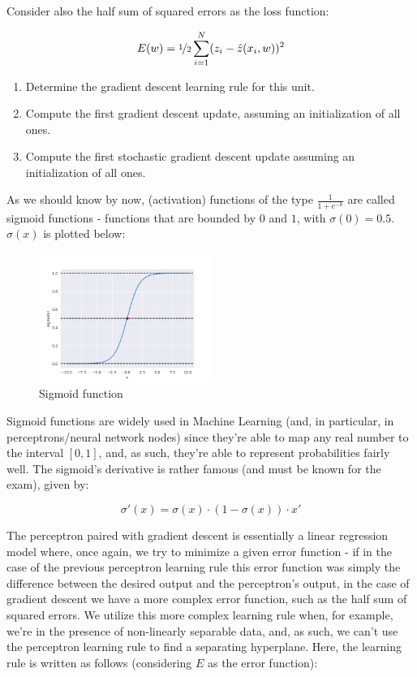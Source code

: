 \documentclass[12pt]{article}
\begin{document}
\begin{enumerate}[leftmargin=\labelsep]
\begin{tcolorbox}[enhanced jigsaw,colback=bg,boxrule=0pt,arc=1pt,halign=center]
    Consider also the half sum of squared errors as the loss function:

    \begin{equation*}
      E(w) = \nicefrac{1}{2} \sum_{i=1}^N (z_i - \hat{z}(x_i, w))^2
    \end{equation*}

    \begin{enumerate}
      \item Determine the gradient descent learning rule for this unit.
      \item Compute the first gradient descent update, assuming an initialization of all ones.
      \item Compute the first stochastic gradient descent update assuming an initialization of all ones.
    \end{enumerate}
  \end{tcolorbox}

  As we should know by now, (activation) functions of the type $\frac{1}{1 + e^{-k}}$
  are called sigmoid functions - functions that are bounded by $0$ and $1$,
  with $\sigma(0) = 0.5$. $\sigma(x)$ is plotted below:

  \begin{figure}[h]
    \centering
    \includegraphics[width=0.5\textwidth]{assets/sigmoid.png}
    \caption{Sigmoid function}
  \end{figure}
  
  Sigmoid functions are widely used in Machine Learning (and, in particular, in
  perceptrons/neural network nodes) since they're able to map any real number
  to the interval $[0, 1]$, and, as such, they're able to represent probabilities
  fairly well. The sigmoid's derivative is rather famous (and must be known
  for the exam), given by:

  $$
    \sigma'(x) = \sigma(x) \cdot (1 - \sigma(x)) \cdot x'
  $$

  The perceptron paired with gradient descent is essentially a linear regression
  model where, once again, we try to minimize a given error function - if in the case
  of the previous perceptron learning rule this error function was simply the
  difference between the desired output and the perceptron's output, in the case
  of gradient descent we have a more complex error function, such as the half
  sum of squared errors. We utilize this more complex learning rule when, for example,
  we're in the presence of non-linearly separable data, and, as such, we can't
  use the perceptron learning rule to find a separating hyperplane. Here, the
  learning rule is written as follows (considering $E$ as the error function):


\end{enumerate}
\end{document}
